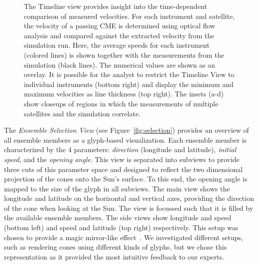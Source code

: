\documentclass[journal]{vgtc}                %
\begin{document}
\begin{figure}
{}
\caption{The Timeline view provides insight into the time-dependent comparison of measured velocities. For each instrument and satellite, the velocity of a passing CME is determined using optical flow analysis and compared against the extracted velocity from the simulation run. Here, the average speeds for each instrument (colored lines) is shown together with the measurements from the simulation (black lines). The numerical values are shown as an overlay. It is possible for the analyst to restrict the Timeline View to individual instruments (bottom right) and display the minimum and maximum velocities as line thickness (top right). The insets (a-d) show closeups of regions in which the measurements of multiple satellites and the simulation correlate.}
\label{fig:timeline}
\end{figure}

%

The \emph{Ensemble Selection View} (see Figure~\ref{fig:selection}) provides an overview of all ensemble members as a glyph-based visualization. Each ensemble member is characterized by the 4 parameters: \emph{direction} (longitude and latitude), \emph{initial speed}, and the \emph{opening angle}. This view is separated into subviews to provide three cuts of this parameter space and designed to reflect the two dimensional projection of the cones onto the Sun's surface. To this end, the opening angle is mapped to the size of the glyph in all subviews. The main view shows the longitude and latitude on the horizontal and vertical axes, providing the direction of the cone when looking at the Sun. The view is focussed such that it is filled by the available ensemble members. The side views show longitude and speed (bottom left) and speed and latitude (top right) respectively. This setup was chosen to provide a magic mirror-like effect~\cite{konig1999multiple}. We investigated different setups, such as rendering cones using different kinds of glyphs, but we chose this representation as it provided the most intuitive feedback to our experts.
\end{document}
